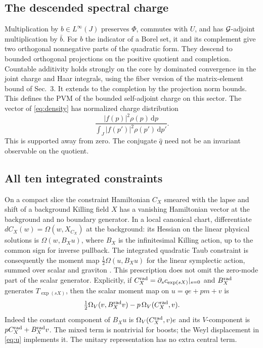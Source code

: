 \documentclass[11pt]{article}
\newcommand{\dd}{\,\mathrm d}
\numberwithin{equation}{section}
\begin{document}
\subsection{The descended spectral charge}

Multiplication by \(b\in L^\infty(J)\) preserves \(\Phi\),
commutes with \(U\), and has \({\cal G}\)-adjoint multiplication
by \(\bar b\). For \(b\) the indicator of a Borel set, it and
its complement give two orthogonal nonnegative parts of the
quadratic form. They descend to bounded orthogonal projections
on the positive quotient and completion. Countable additivity
holds strongly on the core by dominated convergence in the joint
charge and Haar integrals, using the fiber version of the
matrix-element bound of Sec.~3. It extends to the completion by
the projection norm bounds. This defines the PVM of the bounded
self-adjoint charge on this sector. The vector of \eqref{eq:density}
has normalized charge distribution
\[
 \frac{|f(p)|^2\rho(p)\dd p}
      {\int_J|f(p')|^2\rho(p')\dd p'} .
\]
This is supported away from zero. The conjugate \(\widehat q\)
need not be an invariant observable on the quotient.

\subsection{All ten integrated constraints}

On a compact slice the constraint Hamiltonian \(C_X\) smeared
with the lapse and shift of a background Killing field \(X\) has
a vanishing Hamiltonian vector at the background and no
boundary generator. In a local canonical chart,
differentiate \(dC_X(w)=\Omega(w,X_{C_X})\) at the background:
its Hessian on the linear physical solutions is
\(\Omega(w,B_Xu)\), where \(B_X\) is the infinitesimal Killing
action, up to the common sign for inverse pullback.
The integrated quadratic Taub constraint is consequently the
moment map \(\tfrac12\Omega(u,B_X u)\) for the linear
symplectic action, summed over scalar and graviton
\cite{higuchi,mmfree,my}. This prescription does not omit the
zero-mode part of the scalar generator.
Explicitly, if \(C_X^{\rm rad}=\partial_s c_{\exp(sX)}|_{s=0}\)
and \(B_X^{\rm rad}\) generates \(T_{\exp(sX)}\), then the scalar
moment map on \(u=qe+pm+v\) is
\[
 \tfrac12\Omega_V(v,B_X^{\rm rad}v)
                          -p\,\Omega_V(C_X^{\rm rad},v).
\]
Indeed the constant component of \(B_Xu\) is
\(\Omega_V(C_X^{\rm rad},v)e\) and its \(V\)-component is
\(p C_X^{\rm rad}+B_X^{\rm rad}v\).
The mixed term is nontrivial for boosts; the Weyl displacement in
\eqref{eq:u} implements it. The unitary representation has no
extra central term.
\end{document}
